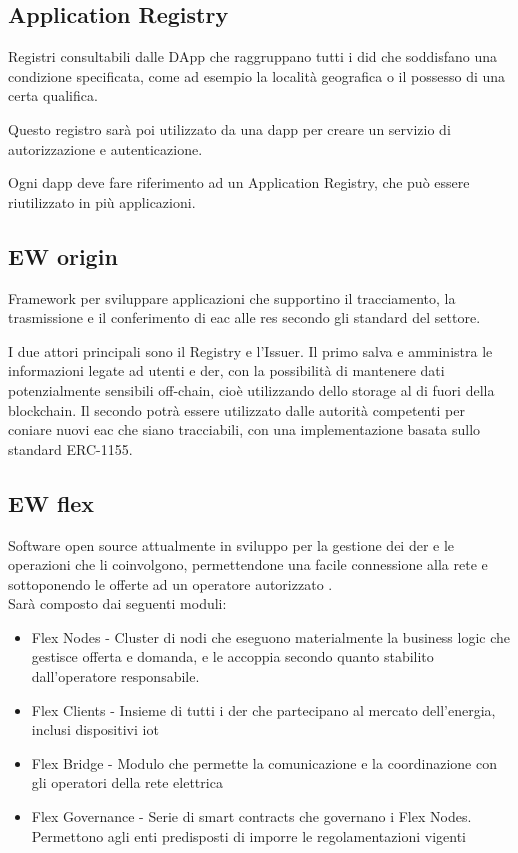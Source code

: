 \subsection{Application Registry}
Registri consultabili dalle DApp che raggruppano tutti i \gls{did} che soddisfano una condizione specificata, come ad esempio la località geografica o il possesso di una certa qualifica.

Questo registro sarà poi utilizzato da una \gls{dapp} per creare un servizio di autorizzazione e autenticazione. 

Ogni \gls{dapp} deve fare riferimento ad un Application Registry, che può essere riutilizzato in più applicazioni.

\subsection{EW origin}
Framework per sviluppare applicazioni che supportino il tracciamento, la trasmissione e il conferimento di \gls{eac} alle \gls{res} secondo gli standard del settore. 

I due attori principali sono il Registry e l'Issuer. 
Il primo salva e amministra le informazioni legate ad utenti e \gls{der}, con la possibilità di mantenere dati potenzialmente sensibili off-chain, cioè utilizzando dello storage al di fuori della blockchain.
Il secondo potrà essere utilizzato dalle autorità competenti per coniare nuovi \gls{eac} che siano tracciabili, con una implementazione basata sullo standard ERC-1155.

\subsection{EW flex}
Software open source attualmente in sviluppo per la gestione dei \gls{der} e le operazioni che li coinvolgono, 
permettendone una facile connessione alla rete e sottoponendo le offerte ad un operatore autorizzato \cite{art:ew-dos}. \\

Sarà composto dai seguenti moduli:

\begin{itemize}
    \item Flex Nodes - Cluster di nodi che eseguono materialmente la business logic che gestisce offerta e domanda, e le accoppia secondo quanto stabilito dall'operatore responsabile.
    \item Flex Clients - Insieme di tutti i \gls{der} che partecipano al mercato dell'energia, inclusi dispositivi \gls{iot}
    \item Flex Bridge - Modulo che permette la comunicazione e la coordinazione con gli operatori della rete elettrica
    \item Flex Governance - Serie di smart contracts che governano i Flex Nodes. Permettono agli enti predisposti di imporre le regolamentazioni vigenti
\end{itemize}